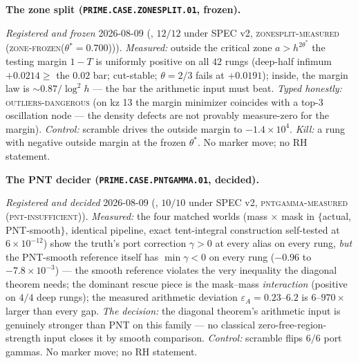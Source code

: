 \par\smallskip\noindent\textbf{The zone split
(\texttt{PRIME.CASE.\allowbreak ZONESPLIT.01}, frozen).}
{\sloppy
\emph{Registered and frozen} 2026-08-09
(, $12/12$ under SPEC v2,
\textsc{zonesplit-measured (zone-frozen($\theta^{*} = 0.700$))}).
\emph{Measured:} outside the critical zone $a > h^{2\theta^*}$
the testing margin $1 - T$ is uniformly positive on all $42$
rungs (deep-half infimum $+0.0214 \ge$ the $0.02$ bar;
cut-stable; $\theta = 2/3$ fails at $+0.0191$); inside, the
margin law is ${\sim}0.87/\log^{2} h$ --- the bar the
arithmetic input must beat.  \emph{Typed honestly:}
\textsc{outliers-dangerous} (on kz 13 the margin minimizer
coincides with a top-3 oscillation node --- the density defects
are not provably measure-zero for the margin).  \emph{Control:}
scramble drives the outside margin to $-1.4\times10^{4}$.
\emph{Kill:} a rung with negative outside margin at the frozen
$\theta^{*}$.  No marker move; no RH statement.\par}


\par\smallskip\noindent\textbf{The PNT decider
(\texttt{PRIME.CASE.\allowbreak PNTGAMMA.01}, decided).}
{\sloppy
\emph{Registered and decided} 2026-08-09
(, $10/10$ under SPEC v2,
\textsc{pntgamma-measured (pnt-insufficient)}).
\emph{Measured:} the four matched worlds (mass $\times$ mask in
$\{$actual, PNT-smooth$\}$, identical pipeline, exact
tent-integral construction self-tested at $6\times10^{-12}$)
show the truth's port correction $\gamma > 0$ at every alias on
every rung, \emph{but} the PNT-smooth reference itself has
$\min\gamma < 0$ on every rung ($-0.96$ to
$-7.8\times10^{-3}$) --- the smooth reference violates the very
inequality the diagonal theorem needs; the dominant rescue
piece is the mask--mass \emph{interaction} (positive on $4/4$
deep rungs); the measured arithmetic deviation $\varepsilon_A =
0.23$--$6.2$ is $6$--$970\times$ larger than every gap.
\emph{The decision:} the diagonal theorem's arithmetic input is
genuinely stronger than PNT on this family --- no classical
zero-free-region-strength input closes it by smooth comparison.
\emph{Control:} scramble flips $6/6$ port gammas.  No marker
move; no RH statement.\par}


